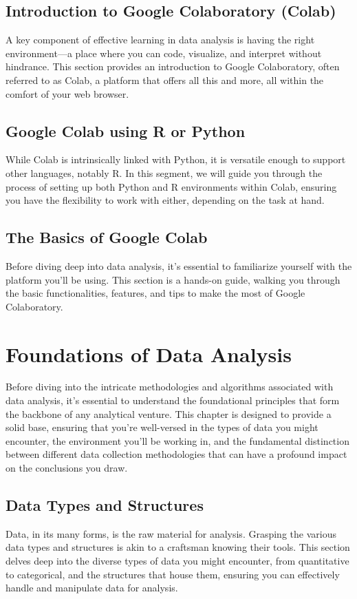 \documentclass[a4paper,12pt]{book}
\begin{document}
\section{Introduction to Google Colaboratory (Colab)}
A key component of effective learning in data analysis is having the right environment—a place where you can code, visualize, and interpret without hindrance. This section provides an introduction to Google Colaboratory, often referred to as Colab, a platform that offers all this and more, all within the comfort of your web browser.

\section{Google Colab using R or Python}
While Colab is intrinsically linked with Python, it is versatile enough to support other languages, notably R. In this segment, we will guide you through the process of setting up both Python and R environments within Colab, ensuring you have the flexibility to work with either, depending on the task at hand.

\section{The Basics of Google Colab}
Before diving deep into data analysis, it's essential to familiarize yourself with the platform you'll be using. This section is a hands-on guide, walking you through the basic functionalities, features, and tips to make the most of Google Colaboratory.

\chapter{Foundations of Data Analysis}
Before diving into the intricate methodologies and algorithms associated with data analysis, it's essential to understand the foundational principles that form the backbone of any analytical venture. This chapter is designed to provide a solid base, ensuring that you're well-versed in the types of data you might encounter, the environment you'll be working in, and the fundamental distinction between different data collection methodologies that can have a profound impact on the conclusions you draw.

\section{Data Types and Structures}
Data, in its many forms, is the raw material for analysis. Grasping the various data types and structures is akin to a craftsman knowing their tools. This section delves deep into the diverse types of data you might encounter, from quantitative to categorical, and the structures that house them, ensuring you can effectively handle and manipulate data for analysis.
\end{document}
